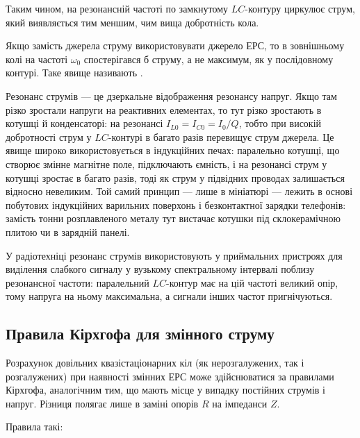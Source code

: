 Таким чином, на резонансній частоті по замкнутому $LC$-контуру циркулює струм, який виявляється тим меншим, чим вища добротність кола.

Якщо замість джерела струму використовувати джерело ЕРС, то в зовнішньому колі на частоті $\omega_0$ спостерігався б  струму, а не максимум, як у послідовному контурі. Таке явище називають .

\begin{Attention}
	Резонанс струмів --- це дзеркальне відображення резонансу напруг. Якщо там різко зростали напруги на реактивних елементах, то тут різко зростають  в котушці й конденсаторі: на резонансі $I_{L0} = I_{C0} = I_0/Q$, тобто при високій добротності струм у $LC$-контурі в багато разів перевищує струм джерела. Це явище широко використовується в індукційних печах: паралельно котушці, що створює змінне магнітне поле, підключають ємність, і на резонансі струм у котушці зростає в багато разів, тоді як струм у підвідних проводах залишається відносно невеликим. Той самий принцип --- лише в мініатюрі --- лежить в основі побутових індукційних варильних поверхонь і безконтактної зарядки телефонів: замість тонни розплавленого металу тут вистачає котушки під склокерамічною плитою чи в зарядній панелі.

	У радіотехніці резонанс струмів використовують у приймальних пристроях для виділення слабкого сигналу у вузькому спектральному інтервалі поблизу резонансної частоти: паралельний $LC$-контур має на цій частоті великий опір, тому напруга на ньому максимальна, а сигнали інших частот пригнічуються.
\end{Attention}


\subsection*{Правила Кірхгофа для змінного струму}

Розрахунок довільних квазістаціонарних кіл (як нерозгалужених, так і розгалужених) при наявності змінних ЕРС може здійснюватися за правилами Кірхгофа, аналогічним тим, що мають місце у
випадку постійних струмів і напруг. Різниця полягає лише в заміні
опорів $R$ на імпеданси $Z$.

Правила такі:

